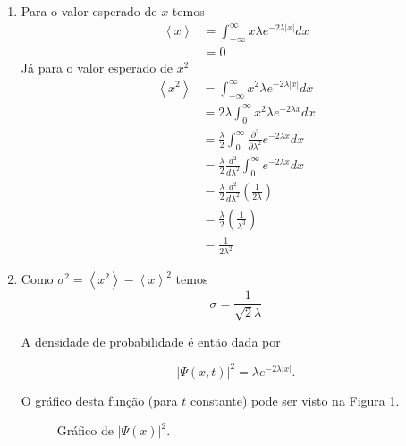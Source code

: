 \documentclass[a4paper, 12pt, notitlepage]{article}
\begin{document}
\begin{enumerate}
\begin{enumerate}
  \item Para o valor esperado de $x$ temos
  \begin{align*}
  \left\langle x \right\rangle &= \int_{-\infty}^{\infty}x \lambda e^{-2\lambda |x|} dx \\
  &= 0
  \end{align*}
  Já para o valor esperado de $x^2$
  \begin{align*}
  \left\langle x^2 \right\rangle &= \int_{-\infty}^{\infty}x^2 \lambda e^{-2\lambda |x|} dx \\
  &= 2\lambda\int_{0}^{\infty}x^2 \lambda e^{-2\lambda x} dx \\
  &= \frac{\lambda}{2} \int_0^{\infty} \frac{\partial^2}{\partial \lambda^2} e^{-2\lambda x} dx \\
  &= \frac{\lambda}{2} \frac{d^2}{d\lambda^2} \int_0^{\infty} e^{-2\lambda x} dx \\
  &= \frac{\lambda}{2} \frac{d^2}{d\lambda^2} \left(\frac{1}{2\lambda}\right) \\
  &= \frac{\lambda}{2} \left(\frac{1}{\lambda^3}\right) \\
  &= \frac{1}{2\lambda^2}
  \end{align*}
  \item Como $\sigma^2 = \left\langle x^2 \right\rangle - \left\langle x \right\rangle ^2$ temos
  \begin{equation*}
  \sigma = \frac{1}{\sqrt{2}\lambda}
  \end{equation*}
  
  A densidade de probabilidade é então dada por
  
  \begin{equation*}
  |\Psi(x,t)|^2 = \lambda e^{-2\lambda |x|}.
  \end{equation*}
  
  O gráfico desta função (para $t$ constante) pode ser visto na Figura \ref{fig:psi2}.
  
  \begin{figure}[!h]
    \centering
    \def\FunctionPsi(#1){1/sqrt(2) * exp(-sqrt(2)*abs(#1))}
  \caption{Gráfico de $|\Psi(x)|^2$.}
  \label{fig:psi2}
  \end{figure}
  

\end{enumerate}
\end{enumerate}
\end{document}
